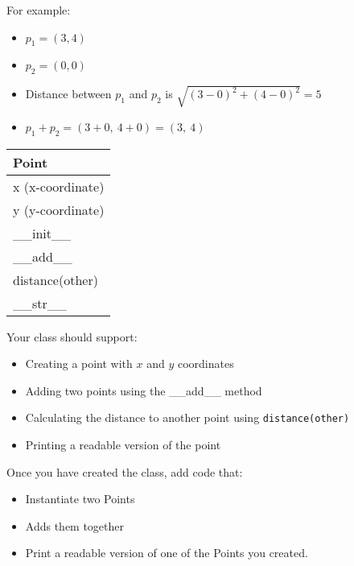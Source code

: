\documentclass{article}
\begin{document}
\begin{enumerate}
		\begin{minipage}[t]{0.65\textwidth}
			For example:
			\begin{itemize}
				\item $p_1 = (3, 4)$
				\item $p_2 = (0, 0)$
				\item Distance between $p_1$ and $p_2$ is $\sqrt{(3 - 0)^2 + (4 - 0)^2} = 5$
				\item $p_1 + p_2 = (3 + 0,\ 4 + 0) = (3,\ 4)$
			\end{itemize}
		\end{minipage}
		\hfill
		\begin{minipage}[t]{0.32\textwidth}
			\vspace{.2em}
			\begin{flushright}
				\begin{tabular}{|l|}
					\hline
					Point \\ \hline
					x (x-coordinate) \\
					y (y-coordinate) \\ \hline
					\_\_init\_\_ \\
					\_\_add\_\_ \\
					distance(other) \\
					\_\_str\_\_ \\ \hline
				\end{tabular}
			\end{flushright}
		\end{minipage}
		
		Your class should support:
		\begin{itemize}
			\item Creating a point with $x$ and $y$ coordinates
			\item Adding two points using the \_\_add\_\_ method
			\item Calculating the distance to another point using \texttt{distance(other)}
			\item Printing a readable version of the point
		\end{itemize}
		
		Once you have created the class, add code that:
		\begin{itemize}
			\item Instantiate two Points
			\item Adds them together
			\item Print a readable version of one of the Points you created.
		\end{itemize}



\end{enumerate}
\end{document}
